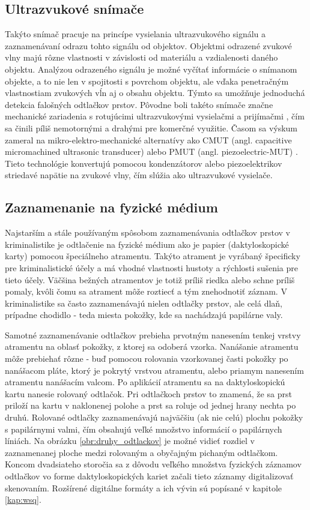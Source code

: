   \subsection{Ultrazvukové snímače}
  Takýto snímač pracuje na princípe vysielania ultrazvukového signálu a zaznamenávaní odrazu tohto signálu od objektov. Objektmi odrazené zvukové vlny
  majú rôzne vlastnosti v závislosti od materiálu a vzdialenosti daného objektu. Analýzou odrazeného signálu je možné vyčítať informácie o snímanom objekte,
  a to nie len v spojitosti s povrchom objektu, ale vďaka penetračným vlastnostiam zvukových vĺn aj o obsahu objektu. Týmto sa umožňuje jednoduchá detekcia
  falošných odtlačkov prstov. Pôvodne boli takéto snímače značne mechanické zariadenia s rotujúcimi ultrazvukovými vysielačmi a prijímačmi \cite{Drahansky},
  čím sa činili píliš nemotornými a drahými pre komerčné využitie. Časom sa výskum zameral na mikro-elektro-mechanické alternatívy ako
  CMUT (angl. capacitive micromachined ultrasonic transducer) \cite{savoia2010cmut} alebo PMUT (angl. piezoelectric-MUT) \cite{tang2015pmut}. Tieto technológie
  konvertujú pomocou kondenzátorov alebo piezoelektrikov striedavé napätie na zvukové vlny, čím slúžia ako ultrazvukové vysielače.

  \subsection{Zaznamenanie na fyzické médium}
  Najstarším a stále používaným spôsobom zaznamenávania odtlačkov prstov v kriminalistike je odtlačenie na fyzické médium ako je papier (daktyloskopické karty)
  pomocou špeciálneho atramentu. Takýto atrament je vyrábaný špecificky pre kriminalistické účely a má vhodné vlastnosti hustoty a rýchlosti sušenia pre tieto
  účely. Väčšina bežných atramentov je totiž príliš riedka alebo schne príliš pomaly, kvôli čomu sa atrament môže roztiecť a tým znehodnotiť záznam.
  V kriminalistike sa často zaznamenávajú nielen odtlačky prstov, ale celá dlaň, prípadne chodidlo - teda miesta pokožky, kde sa nachádzajú papilárne valy.

  Samotné zaznamenávanie odtlačkov prebieha prvotným nanesením tenkej vrstvy atramentu na oblasť pokožky, z ktorej sa odoberá vzorka. Nanášanie atramentu môže
  prebiehať rôzne - buď pomocou rolovania vzorkovanej časti pokožky po nanášacom pláte, ktorý je pokrytý vrstvou atramentu, alebo priamym nanesením atramentu
  nanášacím valcom. Po aplikácií atramentu sa na daktyloskopickú kartu nanesie rolovaný odtlačok. Pri odtlačkoch prstov to znamená, že sa prst priloží
  na kartu v naklonenej polohe a prst sa roluje od jednej hrany nechta po druhú. Rolované odtlačky zaznamenávajú najväčšiu (ak nie celú) plochu pokožky
  s papilárnymi valmi, čím obsahujú veľké množstvo informácií o papilárnych líniách. Na obrázku \ref{obr:druhy_odtlackov} je možné vidieť rozdiel v zaznamenanej
  ploche medzi rolovaným a obyčajným pichaným odtlačkom. Koncom dvadsiateho storočia sa z dôvodu veľkého množstva fyzických záznamov odtlačkov vo forme
  daktyloskopických kariet začali tieto záznamy digitalizovať skenovaním. Rozšírené digitálne formáty a ich vývin sú popísané v kapitole \ref{kap:wsq}.

